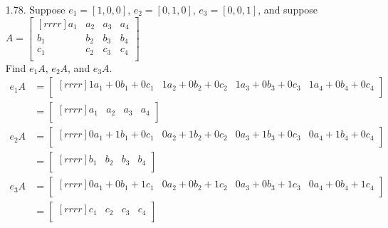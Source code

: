 \documentclass[12pt]{article}
\begin{document}
\begin{enumerate}
\item[1.78.] Suppose $e_1=[1,0,0]$, $e_2=[0,1,0]$, $e_3=[0,0,1]$, and suppose $A=
	\begin{bmatrix}[rrrr]
	a_1 & a_2 & a_3 & a_4\\
	b_1 & b_2 & b_3 & b_4\\
	c_1 & c_2 & c_3 & c_4\\
	\end{bmatrix}$\\
	Find $e_1A$, $e_2A$, and $e_3A$.
	\begin{align*}
	e_1A &=
	\begin{bmatrix}[rrrr]
	1a_1+0b_1+0c_1 & 1a_2+0b_2+0c_2 & 1a_3+0b_3+0c_3 & 1a_4+0b_4+0c_4\\
	\end{bmatrix}\\
	&= \begin{bmatrix}[rrrr] a_1 & a_2 & a_3 & a_4\\ \end{bmatrix}\\
	e_2A &= 
	\begin{bmatrix}[rrrr]
	0a_1+1b_1+0c_1 & 0a_2+1b_2+0c_2 & 0a_3+1b_3+0c_3 & 0a_4+1b_4+0c_4\\
	\end{bmatrix}\\
	&= \begin{bmatrix}[rrrr] b_1 & b_2 & b_3 & b_4\\ \end{bmatrix}\\
	e_3A &= 
	\begin{bmatrix}[rrrr]
	0a_1+0b_1+1c_1 & 0a_2+0b_2+1c_2 & 0a_3+0b_3+1c_3 & 0a_4+0b_4+1c_4\\
	\end{bmatrix}\\
	&= \begin{bmatrix}[rrrr] c_1 & c_2 & c_3 & c_4\\ \end{bmatrix}
	\end{align*}
\end{enumerate}
\end{document}
